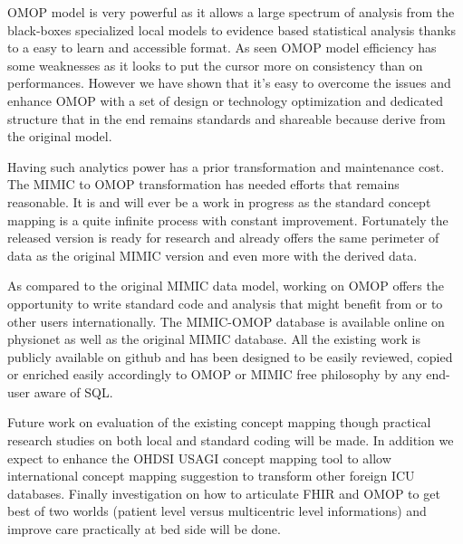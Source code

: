 OMOP model is very powerful as it allows a large spectrum of analysis from the
black-boxes specialized local models to evidence based statistical analysis
thanks to a easy to learn and accessible format. 
As seen OMOP model efficiency has some weaknesses as it looks to put the cursor
more on consistency than on performances. However we have shown that it's easy
to overcome the issues and enhance OMOP with a set of design or technology
optimization and dedicated structure that in the end remains standards and
shareable because derive from the original model.

Having such analytics power has a prior transformation and maintenance cost.
The MIMIC to OMOP transformation has needed efforts that remains reasonable. It
is and will ever be a work in progress as the standard concept mapping is a
quite infinite process with constant improvement. Fortunately the released
version is ready for research and already offers the same perimeter of data as
the original MIMIC version and even more with the derived data.

As compared to the original MIMIC data model, working on OMOP offers the
opportunity to write standard code and analysis that might benefit from or to
other users internationally. The MIMIC-OMOP database is available online on
physionet as well as the original MIMIC database. All the existing work is
publicly available on github \cite{mimic-omop-github} and has been designed to
be easily reviewed, copied or enriched easily accordingly to OMOP or MIMIC free
philosophy by any end-user aware of SQL.

Future work on evaluation of the existing concept mapping though practical
research studies on both local and standard coding will be made. In addition we
expect to enhance the OHDSI USAGI concept mapping tool to allow international
concept mapping suggestion to transform other foreign ICU databases. Finally
investigation on how to articulate FHIR and OMOP to get best of two worlds
(patient level versus multicentric level informations) and improve care
practically at bed side will be done.
